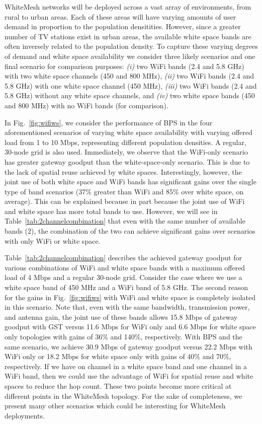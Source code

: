 WhiteMesh networks will be deployed across a vast array of environments, from
rural to urban areas.  Each of these areas will have varying amounts of user 
demand in proportion to the population densitities.  However, since a greater
number of TV stations exist in urban areas, the available white space bands are
often inversely related to the population density. To capture these varying
degrees of demand and white space availability we consider three likely scenarios
and one final scenario for comparison purposes: {\it (i)} two WiFi bands (2.4 and
5.8 GHz) with two white space channels (450 and 800 MHz), {\it (ii)} two WiFi
bands (2.4 and 5.8 GHz) with one white space channel (450 MHz), {\it (iii)} two
WiFi bands (2.4 and 5.8 GHz) without any white space channels, and {\it (iv)}
two white space bands (450 and 800 MHz) with no WiFi bands (for comparison).

In Fig.~\ref{fig:wifiws}, we consider the performance of BPS in the four aforementioned
scenarios of varying white space availability with varying offered load from 1 to 10 Mbps,
representing different population densities. A regular, 30-node grid is also used.
Immediately, we observe that the WiFi-only scenario has greater gateway goodput
than the white-space-only scenario.  This is due to the lack of spatial reuse achieved
by white spaces.  Interestingly, however, the joint use of both white space and WiFi
bands has significant gains over the single type of band scenarios (37\% greater than
WiFi and 85\% over white space, on average).  This can be explained because in part
because the joint use of WiFi and white space has more total bands to use.  However,
we will see in Table~\ref{tab:2channelcombination} that even with the same number of
available bands (2), the combination of the two can achieve significant gains over
scenarios with only WiFi or white space.   

Table~\ref{tab:2channelcombination} describes the achieved gateway goodput for various
combinations of WiFi and white space bands with a maximum offered load of 4 Mbps and
a regular 30-node grid. Consider the case where we use a white space band of 450 MHz 
and a WiFi band of 5.8 GHz. The second reason for the gains in Fig.~\ref{fig:wifiws} 
with WiFi and white space is completely isolated in this scenario. Note that, even
with the same bandwidth, transmission power, and antenna gain, the joint use of 
these bands allows 15.8 Mbps of gateway goodput with GST versus 11.6 Mbps for
WiFi only and 6.6 Mbps for white space only topologies with gains of 36\% and 140\%,
respectively. With BPS and the same scenario, we achieve 30.9 Mbps of gateway goodput 
versus 22.2 Mbps with WiFi only or 18.2 Mbps for white space only with gains of 
40\% and 70\%, respectively. If we have on channel in a white space band and one 
channel in a WiFi band, then we could use the advantage of WiFi for spatial reuse
and white spaces to reduce the hop count. These two points become more critical at
different points in the WhiteMesh topology. For the sake of completeness, we present
many other scenarios which could be interesting for WhiteMesh deployments.


